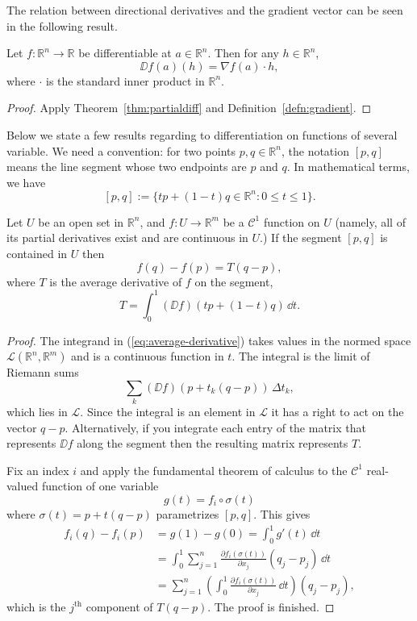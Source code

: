 \documentclass[11pt]{article}
\begin{document}
The relation between directional derivatives and the gradient vector can be seen in the following result.

\begin{thm}
  Let $f : \mathbb{R}^n \to \mathbb{R}$ be differentiable at $a \in \mathbb{R}^n$.  Then for any $h \in \mathbb{R}^n$,
  \[
    \DD f(a) (h) = \nabla f(a) \cdot h,
  \]
  where $\cdot$ is the standard inner product in $\mathbb{R}^n$.
\end{thm}

\begin{proof}
  Apply Theorem~\ref{thm:partialdiff} and Definition~\ref{defn:gradient}.
\end{proof}

Below we state a few results regarding to differentiation on functions of several variable.
We need a convention: for two points $p, q \in \mathbb{R}^n$, the notation $[p,q]$ means the line segment whose two endpoints are $p$ and $q$.
In mathematical terms, we have
\[
  [p,q] := \{ t p + (1-t) q \in \mathbb{R}^n \colon 0 \leqslant t \leqslant 1 \}.
\]

\begin{thm}
  \label{thm:c1mvt}
  Let $U$ be an open set in $\mathbb{R}^n$, and $f : U \to \mathbb{R}^m$ be a $\mathcal{C}^1$ function on $U$ (namely, all of its partial derivatives exist and are continuous in $U$.)
  If the segment $[p,q]$ is contained in $U$ then
  \[
    f(q) - f(p) = T(q-p),
  \]
  where $T$ is the \textsf{average derivative} of $f$ on the segment,
  \begin{equation}
    \label{eq:average-derivative}
    T = \int_0^1 (\DD f)(tp + (1-t)q) \, \dd t.
  \end{equation}
\end{thm}

\begin{proof}
  The integrand in (\ref{eq:average-derivative}) takes values in the normed space $\mathcal{L}(\mathbb{R}^n, \mathbb{R}^m)$ and is a continuous function in $t$.
  The integral is the limit of Riemann sums
  \[
    \sum_k (\DD f)(p + t_k(q-p)) \, \Delta t_k,
  \]
  which lies in $\mathcal{L}$.
  Since the integral is an element in $\mathcal{L}$ it has a right to act on the vector $q-p$.
  Alternatively, if you integrate each entry of the matrix that represents $\DD f$ along the segment then the resulting matrix represents $T$.
  
  Fix an index $i$ and apply the fundamental theorem of calculus to the $\mathcal{C}^1$ real-valued function of one variable
  \[
    g(t) = f_i \circ \sigma(t)
  \]
  where $\sigma(t) = p + t(q-p)$ parametrizes $[p,q]$.
  This gives
  \begin{align*}
    f_i(q) - f_i(p) &= g(1) - g(0) = \int_0^1 g'(t) \, \dd t \\
    &= \int_0^1 \sum_{j=1}^n \frac{\partial f_i(\sigma(t))}{\partial x_j} (q_j - p_j) \, \dd t \\
    &= \sum_{j=1}^n \left( \int_0^1 \frac{\partial f_i(\sigma(t))}{\partial x_j} \, \dd t \right) (q_j - p_j),
  \end{align*}
  which is the $j^\text{th}$ component of $T(q-p)$.
  The proof is finished.
\end{proof}
\end{document}
